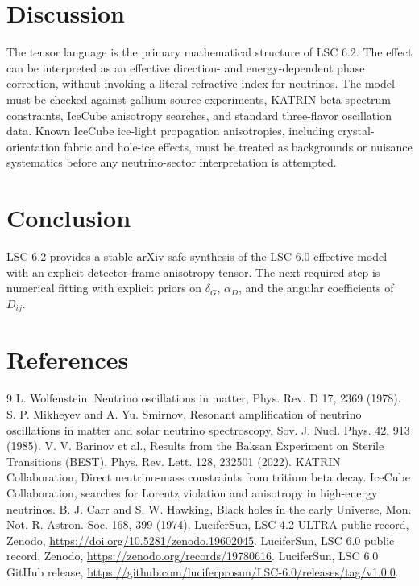 \documentclass[11pt]{article}
\begin{document}
\section{Discussion}
The tensor language is the primary mathematical structure of LSC 6.2. The effect can be interpreted as an effective direction- and energy-dependent phase correction, without invoking a literal refractive index for neutrinos. The model must be checked against gallium source experiments, KATRIN beta-spectrum constraints, IceCube anisotropy searches, and standard three-flavor oscillation data. Known IceCube ice-light propagation anisotropies, including crystal-orientation fabric and hole-ice effects, must be treated as backgrounds or nuisance systematics before any neutrino-sector interpretation is attempted.

\section{Conclusion}
LSC 6.2 provides a stable arXiv-safe synthesis of the LSC 6.0 effective model with an explicit detector-frame anisotropy tensor. The next required step is numerical fitting with explicit priors on $\delta_G$, $\alpha_D$, and the angular coefficients of $D_{ij}$.

\section{References}
\begin{thebibliography}{9}
 L. Wolfenstein, Neutrino oscillations in matter, Phys. Rev. D 17, 2369 (1978).
 S. P. Mikheyev and A. Yu. Smirnov, Resonant amplification of neutrino oscillations in matter and solar neutrino spectroscopy, Sov. J. Nucl. Phys. 42, 913 (1985).
 V. V. Barinov et al., Results from the Baksan Experiment on Sterile Transitions (BEST), Phys. Rev. Lett. 128, 232501 (2022).
 KATRIN Collaboration, Direct neutrino-mass constraints from tritium beta decay.
 IceCube Collaboration, searches for Lorentz violation and anisotropy in high-energy neutrinos.
 B. J. Carr and S. W. Hawking, Black holes in the early Universe, Mon. Not. R. Astron. Soc. 168, 399 (1974).
 LuciferSun, LSC 4.2 ULTRA public record, Zenodo, \url{https://doi.org/10.5281/zenodo.19602045}.
 LuciferSun, LSC 6.0 public record, Zenodo, \url{https://zenodo.org/records/19780616}.
 LuciferSun, LSC 6.0 GitHub release, \url{https://github.com/luciferprosun/LSC-6.0/releases/tag/v1.0.0}.
\end{thebibliography}
\end{document}
